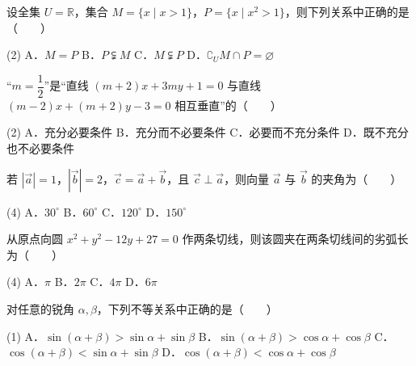

\begin{question}
设全集 $U = \mathbb{R}$，集合 $M = \{x \mid x > 1\}$，$P = \{x \mid x^2 > 1\}$，则下列关系中正确的是\mbox{（　　）}

\begin{gkopts}(2)
\task A．$M = P$
\task B．$P \subsetneqq M$
\task C．$M \subsetneqq P$
\task D．$\complement_U M \cap P = \varnothing$
\end{gkopts}

\end{question}
\begin{question}
“$m = \dfrac{1}{2}$”是“直线 $(m+2)x + 3my + 1 = 0$ 与直线 $(m-2)x + (m+2)y - 3 = 0$ 相互垂直”的\mbox{（　　）}

\begin{gkopts}(2)
\task A．充分必要条件
\task B．充分而不必要条件
\task C．必要而不充分条件
\task D．既不充分也不必要条件
\end{gkopts}

\end{question}
\begin{question}
若 $|\vec{a}| = 1$，$|\vec{b}| = 2$，$\vec{c} = \vec{a} + \vec{b}$，且 $\vec{c} \perp \vec{a}$，则向量 $\vec{a}$ 与 $\vec{b}$ 的夹角为\mbox{（　　）}

\begin{gkopts}(4)
\task A．$30^\circ$
\task B．$60^\circ$
\task C．$120^\circ$
\task D．$150^\circ$
\end{gkopts}

\end{question}
\begin{question}
从原点向圆 $x^2 + y^2 - 12y + 27 = 0$ 作两条切线，则该圆夹在两条切线间的劣弧长为\mbox{（　　）}

\begin{gkopts}(4)
\task A．$\pi$
\task B．$2\pi$
\task C．$4\pi$
\task D．$6\pi$
\end{gkopts}

\end{question}
\begin{question}
对任意的锐角 $\alpha, \beta$，下列不等关系中正确的是\mbox{（　　）}

\begin{gkopts}(1)
\task A．$\sin(\alpha + \beta) > \sin\alpha + \sin\beta$
\task B．$\sin(\alpha + \beta) > \cos\alpha + \cos\beta$
\task C．$\cos(\alpha + \beta) < \sin\alpha + \sin\beta$
\task D．$\cos(\alpha + \beta) < \cos\alpha + \cos\beta$
\end{gkopts}

\end{question}
